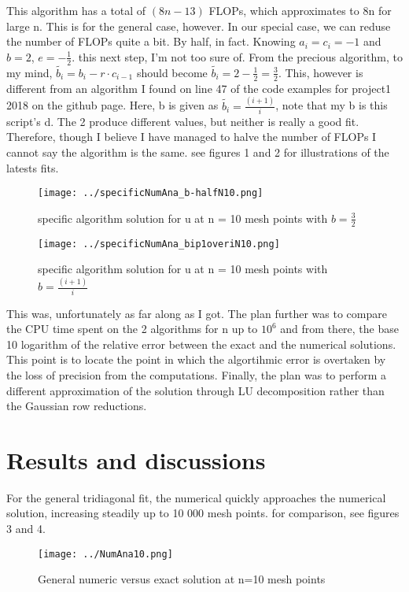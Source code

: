 \documentclass[10pt,showpacs,preprintnumbers,footinbib,amsmath,amssymb,aps,prl,twocolumn,groupedaddress,superscriptaddress,showkeys]{revtex4-1}
\begin{document}
This algorithm has a total of $(8n-13)$ FLOPs, which approximates to 8n for large n. This is for the general case, however. In our special case, we can reduse the number of FLOPs quite a bit. By half, in fact. 
Knowing $a_i = c_{i} = -1$ and $b=2$, $e = -\frac{1}{2}$. this next step, I'm not too sure of. From the precious algorithm, to my mind, $\tilde{b_{i}} = b_{i} - r \cdot c_{i-1}$ should become $\tilde{b_i}=2-\frac{1}{2}=\frac{3}{2}$. This, however is different from an algorithm I found on line 47 of the code examples for project1 2018 on the github page. Here, b is given as $\tilde{b_i} = \frac{(i+1)}{i}$, note that my b is this script's d. The 2 produce different values, but neither is really a good fit. Therefore, though I believe I have managed to halve the number of FLOPs I cannot say the algorithm is the same. see figures 1 and 2 for illustrations of the latests fits.

\begin{figure}[hbtp]
\texttt{[image: ../specificNumAna\_b-halfN10.png]}
\caption{specific algorithm solution for u at n = 10 mesh points with $b=\frac{3}{2}$} 
\label{fig:specific algorithm solution of u at n = 10 mesh points}
\end{figure}

\begin{figure}[hbtp]
\texttt{[image: ../specificNumAna\_bip1overiN10.png]}
\caption{specific algorithm solution for u at n = 10 mesh points with $b=\frac{(i+1)}{i}$} 
\label{fig:n10points}
\end{figure}
This was, unfortunately as far along as I got. The plan further was to compare the CPU time spent on the 2 algorithms for n up to $10^6$ and from there, the base 10 logarithm of the relative error between the exact and the numerical solutions. This point is to locate the point in which the algortihmic error is overtaken by the loss of precision from the computations. Finally, the plan was to perform a different approximation of the solution through LU decomposition rather than the Gaussian row reductions. 

\section{Results and discussions}
For the general tridiagonal fit, the numerical quickly approaches the numerical solution, increasing steadily up to 10 000 mesh points. for comparison, see figures 3 and 4.
\begin{figure}[hbtp]
\texttt{[image: ../NumAna10.png]}
\caption{General numeric versus exact solution at n=10 mesh points} 
\label{fig:specific algorithm solution of u at n = 10 mesh points}
\end{figure}
\end{document}

